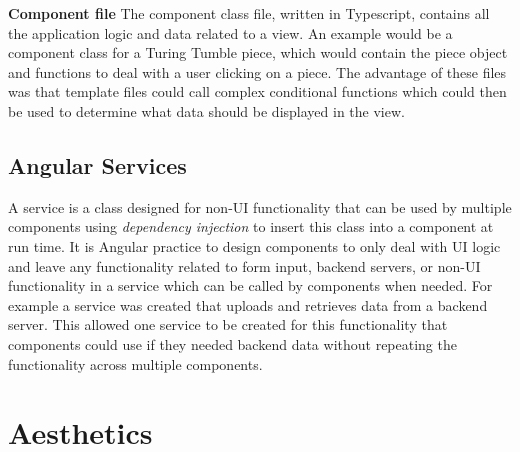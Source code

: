\documentclass{l4proj}
\begin{document}
\textbf{Component file}
The component class file, written in Typescript, contains all the application logic and data related to a view. An example would be a component class for a Turing Tumble piece, which would contain the piece object and functions to deal with a user clicking on a piece. The advantage of these files was that template files could call complex conditional functions which could then be used to determine what data should be displayed in the view.

\subsection{Angular Services}
A service is a class designed for non-UI functionality that can be used by multiple components using \emph{dependency injection} to insert this class into a component at run time. It is Angular practice to design components to only deal with UI logic and leave any functionality related to form input, backend servers, or non-UI functionality in a service which can be called by components when needed. For example a service was created that uploads and retrieves data from a backend server. This allowed one service to be created for this functionality that components could use if they needed backend data without repeating the functionality across multiple components. 




\section{Aesthetics}
\end{document}
